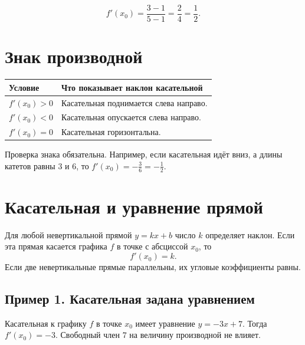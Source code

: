 \documentclass[a4paper,12pt]{article}
\newcommand{\key}[1]{\textcolor{darkaccent}{#1}}
\begin{document}
\begin{center}
\end{center}
\[
 f'(x_0)=\frac{3-1}{5-1}=\frac24=\frac12.
\]

\section{Знак производной}
\begin{center}
\begin{tabularx}{\linewidth}{@{}>{\raggedright\arraybackslash}p{.24\linewidth}X@{}}
\toprule
\textbf{Условие} & \textbf{Что показывает наклон касательной}\\
\midrule
$f'(x_0)>0$ & Касательная поднимается слева направо.\\
$f'(x_0)<0$ & Касательная опускается слева направо.\\
$f'(x_0)=0$ & Касательная горизонтальна.\\
\bottomrule
\end{tabularx}
\end{center}
\key{Проверка знака обязательна.} Например, если касательная идёт вниз, а длины катетов равны $3$ и $6$, то $f'(x_0)=-\frac36=-\frac12$.

\section{Касательная и уравнение прямой}
Для любой невертикальной прямой $y=kx+b$ число $k$ определяет наклон. Если эта прямая касается графика $f$ в точке с абсциссой $x_0$, то
\[
\boxed{f'(x_0)=k.}
\]
Если две невертикальные прямые параллельны, их угловые коэффициенты равны.

\subsection{Пример 1. Касательная задана уравнением}
Касательная к графику $f$ в точке $x_0$ имеет уравнение $y=-3x+7$. Тогда $f'(x_0)=-3$. Свободный член $7$ на величину производной не влияет.
\end{document}
